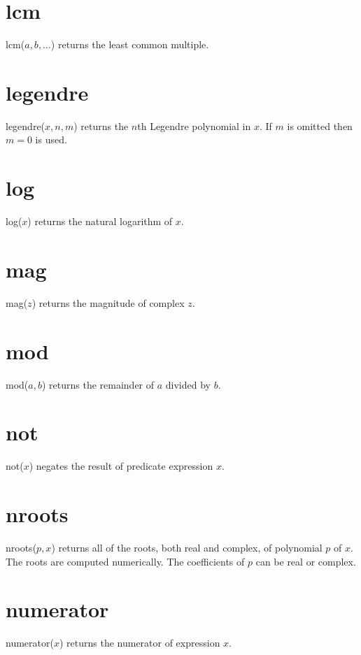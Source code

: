 \documentclass[11pt]{article}
\begin{document}
\section*{lcm}
lcm($a,b,\ldots$) returns the least common multiple.

\section*{legendre}
legendre($x,n,m$) returns the $n$th Legendre polynomial in $x$.
If $m$ is omitted then $m=0$ is used.

\section*{log}
log($x$) returns the natural logarithm of $x$.

\section*{mag}
mag($z$) returns the magnitude of complex $z$.

\section*{mod}
mod($a,b$) returns the remainder of $a$ divided by $b$.

\section*{not}
not($x$) negates the result of predicate expression $x$.

\section*{nroots}
nroots($p,x$) returns all of the roots, both real and complex, of
polynomial $p$ of $x$.
The roots are computed numerically.
The coefficients of $p$ can be real or complex.

\section*{numerator}
numerator($x$) returns the numerator of expression $x$.
\end{document}
